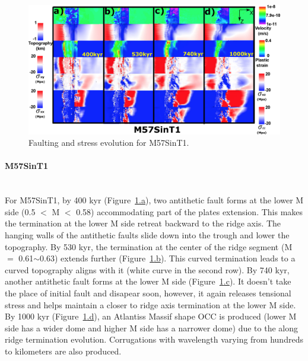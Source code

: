\begin{figure}[h]
 \centering
  \includegraphics[width=1.0\textwidth]{./Figures/fig_Results_Weakening_3_M57SinT1_time_evolution.eps}
 \caption{Faulting and stress evolution for M57SinT1.}
\label{fig_Results_Weakenging_3}
\end{figure}

\paragraph{M57SinT1}\label{para_M57SinT1}
~\\
For M57SinT1, by 400 kyr (Figure~\hyperref[fig_Results_Weakenging_3]{\ref{fig_Results_Weakenging_3}.a}), two antithetic fault forms at the lower M side (0.5 $<$ M $<$ 0.58) accommodating part of the plates extension. This makes the termination at the lower M side retreat backward to the ridge axis. The hanging walls of the antithetic faults slide down into the trough and lower the topography. By 530 kyr, the termination at the center of the ridge segment (M $=$ 0.61$\sim$0.63) extends further (Figure~\hyperref[fig_Results_Weakenging_3]{\ref{fig_Results_Weakenging_3}.b}). This curved termination leads to a curved topography aligns with it (white curve in the second row). By 740 kyr, another antithetic fault forms at the lower M side (Figure~\hyperref[fig_Results_Weakenging_3]{\ref{fig_Results_Weakenging_3}.c}). It doesn't take the place of initial fault and disapear soon, however, it again releases tensional stress and helps maintain a closer to ridge axis termination at the lower M side. By 1000 kyr (Figure~\hyperref[fig_Results_Weakenging_3]{\ref{fig_Results_Weakenging_3}.d}), an Atlantiss Massif shape OCC is produced (lower M side has a wider dome and higher M side has a narrower dome) due to the along ridge termination evolution. Corrugations with wavelength varying from hundreds to kilometers are also produced.       

